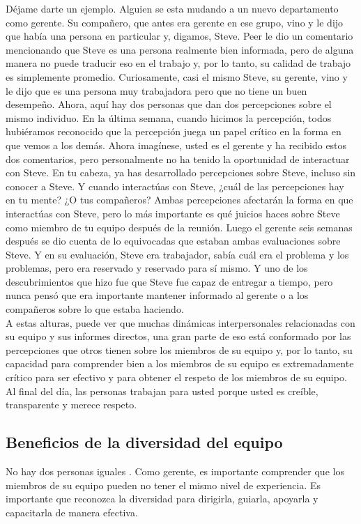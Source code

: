 \documentclass[10pt]{book}
\begin{document}
Déjame darte un ejemplo.  Alguien se esta mudando a un nuevo departamento como gerente. Su compañero, que antes era gerente en ese grupo, vino y le dijo que había una persona en particular y, digamos, Steve. Peer le dio un comentario mencionando que Steve es una persona realmente bien informada, pero de alguna manera no puede traducir eso en el trabajo y, por lo tanto, su calidad de trabajo es simplemente promedio. Curiosamente, casi el mismo Steve, su gerente, vino y le dijo que es una persona muy trabajadora pero que no tiene un buen desempeño. Ahora, aquí hay dos personas que dan dos percepciones sobre el mismo individuo. En la última semana, cuando hicimos la percepción, todos hubiéramos reconocido que la percepción juega un papel crítico en la forma en que vemos a los demás. Ahora imagínese, usted es el gerente y ha recibido estos dos comentarios, pero personalmente no ha tenido la oportunidad de interactuar con Steve. En tu cabeza, ya has desarrollado percepciones sobre Steve, incluso sin conocer a Steve. Y cuando interactúas con Steve, ¿cuál de las percepciones hay en tu mente? ¿O tus compañeros? Ambas percepciones afectarán la forma en que interactúas con Steve, pero lo más importante es qué juicios haces sobre Steve como miembro de tu equipo después de la reunión. Luego el gerente seis semanas después se dio cuenta de lo equivocadas que estaban ambas evaluaciones sobre Steve. Y en su evaluación, Steve era trabajador, sabía cuál era el problema y los problemas, pero era reservado y reservado para sí mismo. Y uno de los descubrimientos que hizo  fue que Steve fue capaz de entregar a tiempo, pero nunca pensó que era importante mantener informado al gerente o a los compañeros sobre lo que estaba haciendo.\\
A estas alturas, puede ver que muchas dinámicas interpersonales relacionadas con su equipo y sus informes directos, una gran parte de eso está conformado por las percepciones que otros tienen sobre los miembros de su equipo y, por lo tanto, su capacidad para comprender bien a los miembros de su equipo es extremadamente crítico para ser efectivo y para obtener el respeto de los miembros de su equipo.\\
Al final del día, las personas trabajan para usted porque usted es creíble, transparente y merece respeto.
\subsection{Beneficios de la diversidad del equipo}
No hay dos personas iguales . Como gerente, es importante comprender que los miembros de su equipo pueden no tener el mismo nivel de experiencia. Es importante que reconozca la diversidad para dirigirla, guiarla, apoyarla y capacitarla de manera efectiva.\\
\end{document}
